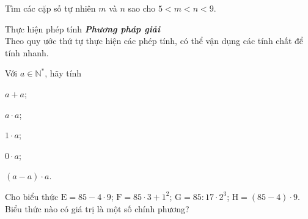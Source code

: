 \begin{bt}%
Tìm các cặp số tự nhiên $m$ và $n$ sao cho $5<m<n<9$.
\end{bt}

\begin{dang}{Thực hiện phép tính}
	\textbf{\textit{Phương pháp giải}}\\
	Theo quy ước thứ tự thực hiện các phép tính, có thể vận dụng các tính chất để tính nhanh.
\end{dang}

\begin{vd}
	Với $a\in \mathbb{N}^*$, hãy tính
	\begin{enumEX}{5}
		\item $a+a$;
		\item $a\cdot a$;
		\item $1\cdot a$;
		\item $0\cdot a$;
		\item $(a-a)\cdot a$.
	\end{enumEX}
\end{vd}
\begin{vd}
	Cho biểu thức $\mathrm{E}=85-4\cdot9$; $\mathrm{F}=85\cdot3+1^2$; $\mathrm{G}=85 : 17\cdot2^3$; $\mathrm{H}=(85-4)\cdot9$.
Biểu thức nào có giá trị là một số chính phương?
\end{vd}
